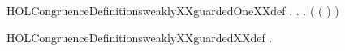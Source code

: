 \newcommand{\HOLCongruenceDefinitionsSGXXdef}{\UseVerbatim{HOLCongruenceDefinitionsSGXXdef}}
\begin{SaveVerbatim}{HOLCongruenceDefinitionsweaklyXXguardedOneXXdef}
\HOLTokenTurnstile{} \HOLSymConst{\HOLTokenForall{}}.
         \HOLSymConst{\HOLTokenEquiv{}}
       \HOLSymConst{\HOLTokenForall{}}.  \HOLConst{\HOLTokenIn{}}   \HOLSymConst{\HOLTokenImp{}} \HOLSymConst{\HOLTokenForall{}}.   \HOLSymConst{\HOLTokenConj{}} ( ( ) \HOLSymConst{=} ) \HOLSymConst{\HOLTokenImp{}}  
\end{SaveVerbatim}
\newcommand{\HOLCongruenceDefinitionsweaklyXXguardedOneXXdef}{\UseVerbatim{HOLCongruenceDefinitionsweaklyXXguardedOneXXdef}}
\begin{SaveVerbatim}{HOLCongruenceDefinitionsweaklyXXguardedXXdef}
\HOLTokenTurnstile{} \HOLSymConst{\HOLTokenForall{}}.   \HOLSymConst{\HOLTokenEquiv{}}   
\end{SaveVerbatim}
\newcommand{\HOLCongruenceDefinitionsweaklyXXguardedXXdef}{\UseVerbatim{HOLCongruenceDefinitionsweaklyXXguardedXXdef}}
